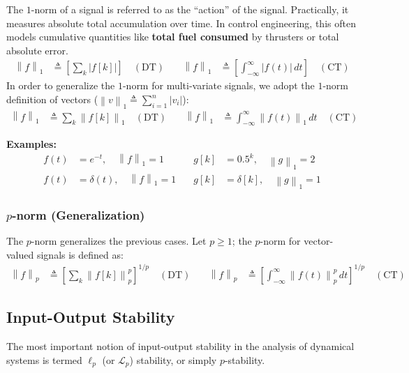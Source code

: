 \documentclass[11pt, a4paper, twoside]{article}
\newcommand{\norm}[1]{\left\lVert#1\right\rVert}
\newcommand{\abs}[1]{\left\lvert#1\right\rvert}
\theoremstyle{plain}
\theoremstyle{definition}
\begin{document}
The $1$-norm of a signal is referred to as the ``action'' of the signal. Practically, it measures absolute total accumulation over time. In control engineering, this often models cumulative quantities like \textbf{total fuel consumed} by thrusters or total absolute error.
%
\begin{align*}
	\norm{f}_{1} &\triangleq \left[ \sum_{k} \abs{f[k]} \right] \quad (\mathrm{DT}) \quad &
	\norm{f}_{1} &\triangleq \left[ \int_{-\infty}^{\infty} \abs{f(t)} \, dt \right] \quad (\mathrm{CT})
\end{align*}
%
In order to generalize the $1$-norm for multi-variate signals, we adopt the $1$-norm definition of vectors ($\norm{v}_{1} \triangleq \sum_{i=1}^{n} \abs{v_i}$):
%
\begin{align*}
	\norm{f}_{1} &\triangleq \sum_{k} \norm{f[k]}_1 \quad (\mathrm{DT}) \quad &
	\norm{f}_{1} &\triangleq \int_{-\infty}^{\infty} \norm{f(t)}_1 \, dt \quad (\mathrm{CT})
\end{align*}

\textbf{Examples:}
%
\begin{align*}
	f(t) &= e^{-t} , \quad \norm{f}_{1} = 1 &\quad g[k] &= 0.5^k , \quad \norm{g}_{1} = 2 \\
	f(t) &= \delta(t) , \quad \norm{f}_{1} = 1 &\quad g[k] &= \delta[k] , \quad \norm{g}_{1} = 1
\end{align*}

\subsubsection*{$p$-norm (Generalization)} 

The $p$-norm generalizes the previous cases. Let $p \geq 1$; the $p$-norm for vector-valued signals is defined as:
%
\begin{align*}
	\norm{f}_{p} &\triangleq 
	\left[ \sum_{k} \norm{f[k]}_p^p \right]^{1/p}
	\quad (\mathrm{DT}) \quad &
	\norm{f}_{p} &\triangleq \left[ \int_{-\infty}^{\infty} \norm{f(t)}_p^p \, dt \right]^{1/p}
	\quad (\mathrm{CT})
\end{align*}

\subsection{Input-Output Stability}

The most important notion of input-output stability in the analysis of dynamical systems is termed $\ell_p$ (or $\mathcal{L}_p$) stability, or simply $p$-stability. 
\end{document}
